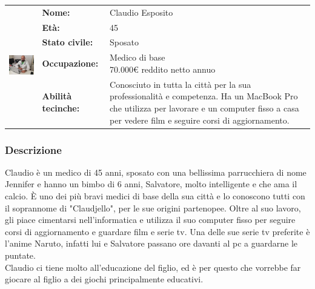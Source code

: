 \documentclass[../Report.tex]{subfiles}
\begin{document}
    \vspace{1.5cm}

    \begin{table}[H]
        \begin{tabular}{|c|l|p{7cm}|}
            \hline
            \multirow{5}{*}{\includegraphics[width=5cm, height=5cm]{Claudio.jpg}} 
                & \textbf{Nome:} & Claudio Esposito\\ \cmidrule{2-3}
            & \textbf{Età:} & 45 \\ \cmidrule{2-3}
            & \textbf{Stato civile:} & Sposato \\ \cmidrule{2-3}
            & \textbf{Occupazione:} & \makecell{Medico di base \\ 70.000€ reddito netto annuo} \\ \cmidrule{2-3}
            & \textbf{Abilità tecinche:} &  Conosciuto in tutta la città per la sua professionalità e competenza. Ha un MacBook Pro che utilizza per lavorare e un computer fisso a casa per vedere film e seguire corsi di aggiornamento.\\
            \hline
        \end{tabular}
    \end{table}

    \subsubsection{Descrizione}
    Claudio è un medico di 45 anni, sposato con una bellissima parrucchiera di nome Jennifer e hanno un bimbo di 6 anni, Salvatore, molto intelligente e che ama il calcio. È uno dei più bravi medici di base della sua città e lo conoscono tutti con il soprannome di "Claudjello", per le sue origini partenopee. Oltre al suo lavoro, gli piace cimentarsi nell'informatica e utilizza il suo computer fisso per seguire corsi di aggiornamento e guardare film e serie tv. Una delle sue serie tv preferite è l'anime Naruto, infatti lui e Salvatore passano ore davanti al pc a guardarne le puntate.\\
    Claudio ci tiene molto all'educazione del figlio, ed è per questo che vorrebbe far giocare al figlio a dei giochi principalmente educativi.
\end{document}
